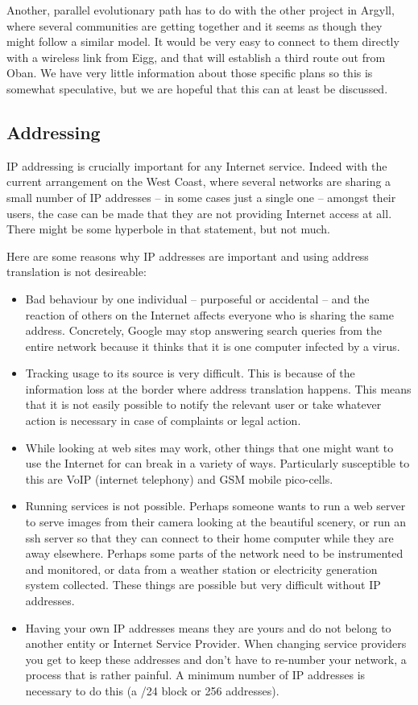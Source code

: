 Another, parallel evolutionary path has to do with the other project
in Argyll, where several communities are getting together and it seems
as though they might follow a similar model. It would be very easy to
connect to them directly with a wireless link from Eigg, and that will
establish a third route out from Oban. We have very little information
about those specific plans so this is somewhat speculative, but we are
hopeful that this can at least be discussed.

\subsection{Addressing}

IP addressing is crucially important for any Internet service. Indeed
with the current arrangement on the West Coast, where several networks
are sharing a small number of IP addresses -- in some cases just a
single one -- amongst their users, the case can be made that they are
not providing Internet access at all. There might be some hyperbole in
that statement, but not much.

Here are some reasons why IP addresses are important and using address
translation is not desireable:
\begin{itemize}
  \item Bad behaviour by one individual -- purposeful or accidental --
    and the reaction of others on the Internet affects everyone who is
    sharing the same address. Concretely, Google may stop answering
    search queries from the entire network because it thinks that it
    is one computer infected by a virus.
  \item Tracking usage to its source is very difficult. This is
    because of the information loss at the border where address
    translation happens. This means that it is not easily possible to
    notify the relevant user or take whatever action is necessary in
    case of complaints or legal action.
  \item While looking at web sites may work, other things that one
    might want to use the Internet for can break in a variety of
    ways. Particularly susceptible to this are VoIP (internet
    telephony) and GSM mobile pico-cells.
  \item Running services is not possible. Perhaps someone wants to run
    a web server to serve images from their camera looking at the
    beautiful scenery, or run an ssh server so that they can connect
    to their home computer while they are away elsewhere. Perhaps some
    parts of the network need to be instrumented and monitored, or
    data from a weather station or electricity generation system
    collected. These things are possible but very difficult without IP
    addresses.
  \item Having your own IP addresses means they are yours and do not
    belong to another entity or Internet Service Provider. When
    changing service providers you get to keep these addresses and
    don't have to re-number your network, a process that is rather
    painful. A minimum number of IP addresses is necessary to do this
    (a /24 block or 256 addresses).
\end{itemize}


